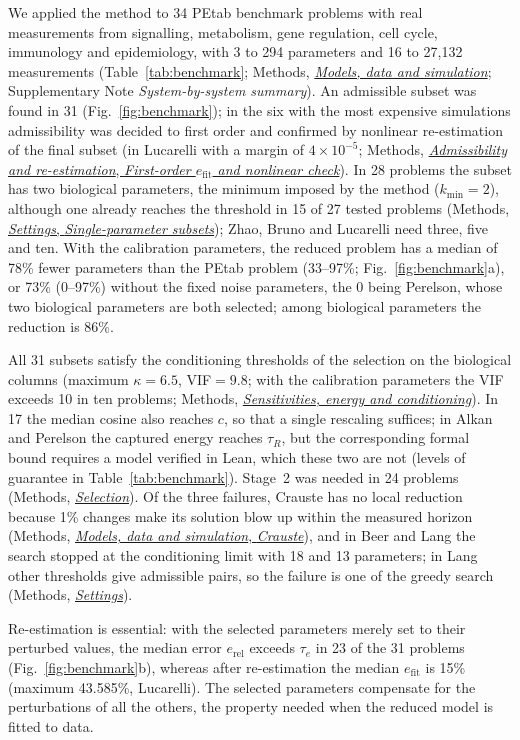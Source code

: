\documentclass[pdflatex,sn-nature]{sn-jnl}
\theoremstyle{plain}
\newcommand{\mref}[2]{\hyperref[#1]{#2}}
\begin{document}
We applied the method to 34 PEtab benchmark problems with real measurements\cite{bib31,bib27} from signalling, metabolism, gene regulation, cell cycle, immunology and epidemiology, with 3 to 294 parameters and 16 to 27,132 measurements (Table~\ref{tab:benchmark}; Methods, \mref{met:models}{\emph{Models, data and simulation}}; Supplementary Note \textit{System-by-system summary}). An admissible subset was found in 31 (Fig.~\ref{fig:benchmark}); in the six with the most expensive simulations admissibility was decided to first order and confirmed by nonlinear re-estimation of the final subset (in Lucarelli with a margin of $4\times10^{-5}$; Methods, \mref{met:adm-firstorder}{\emph{Admissibility and re-estimation}, \emph{First-order $e_{\mathrm{fit}}$ and nonlinear check}}). In 28 problems the subset has two biological parameters, the minimum imposed by the method ($k_{\min}=2$), although one already reaches the threshold in 15 of 27 tested problems (Methods, \mref{met:single}{\emph{Settings}, \emph{Single-parameter subsets}}); Zhao, Bruno and Lucarelli need three, five and ten. With the calibration parameters, the reduced problem has a median of 78\% fewer parameters than the PEtab problem (33--97\%; Fig.~\ref{fig:benchmark}a), or 73\% (0--97\%) without the fixed noise parameters, the 0 being Perelson, whose two biological parameters are both selected; among biological parameters the reduction is 86\%.

All 31 subsets satisfy the conditioning thresholds of the selection on the biological columns (maximum $\kappa=6.5$, VIF$=9.8$; with the calibration parameters the VIF exceeds 10 in ten problems; Methods, \mref{met:sens}{\emph{Sensitivities, energy and conditioning}}). In 17 the median cosine also reaches $c$, so that a single rescaling suffices; in Alkan and Perelson the captured energy reaches $\tau_R$, but the corresponding formal bound requires a model verified in Lean, which these two are not (levels of guarantee in Table~\ref{tab:benchmark}). Stage~2 was needed in 24 problems (Methods, \mref{met:selection}{\emph{Selection}}). Of the three failures, Crauste has no local reduction because 1\% changes make its solution blow up within the measured horizon (Methods, \mref{met:crauste}{\emph{Models, data and simulation}, \emph{Crauste}}), and in Beer and Lang the search stopped at the conditioning limit with 18 and 13 parameters; in Lang other thresholds give admissible pairs, so the failure is one of the greedy search (Methods, \mref{met:settings}{\emph{Settings}}).

Re-estimation is essential: with the selected parameters merely set to their perturbed values, the median error $e_{\mathrm{rel}}$ exceeds $\tau_e$ in 23 of the 31 problems (Fig.~\ref{fig:benchmark}b), whereas after re-estimation the median $e_{\mathrm{fit}}$ is 15\% (maximum 43.585\%, Lucarelli). The selected parameters compensate for the perturbations of all the others, the property needed when the reduced model is fitted to data.
\end{document}
